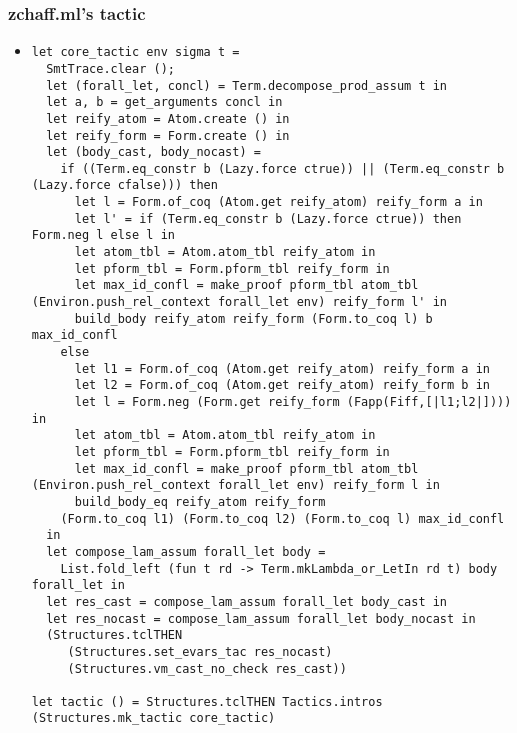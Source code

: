 \documentclass{beamer}
\begin{document}
\begin{frame}[fragile]
\frametitle{zchaff.ml's tactic}
\begin{itemize}
\item
\begin{Verbatim}[fontsize=\tiny]
let core_tactic env sigma t =
  SmtTrace.clear ();
  let (forall_let, concl) = Term.decompose_prod_assum t in
  let a, b = get_arguments concl in
  let reify_atom = Atom.create () in
  let reify_form = Form.create () in
  let (body_cast, body_nocast) =
    if ((Term.eq_constr b (Lazy.force ctrue)) || (Term.eq_constr b (Lazy.force cfalse))) then
      let l = Form.of_coq (Atom.get reify_atom) reify_form a in
      let l' = if (Term.eq_constr b (Lazy.force ctrue)) then Form.neg l else l in
      let atom_tbl = Atom.atom_tbl reify_atom in
      let pform_tbl = Form.pform_tbl reify_form in
      let max_id_confl = make_proof pform_tbl atom_tbl (Environ.push_rel_context forall_let env) reify_form l' in
      build_body reify_atom reify_form (Form.to_coq l) b max_id_confl
    else
      let l1 = Form.of_coq (Atom.get reify_atom) reify_form a in
      let l2 = Form.of_coq (Atom.get reify_atom) reify_form b in
      let l = Form.neg (Form.get reify_form (Fapp(Fiff,[|l1;l2|]))) in
      let atom_tbl = Atom.atom_tbl reify_atom in
      let pform_tbl = Form.pform_tbl reify_form in
      let max_id_confl = make_proof pform_tbl atom_tbl (Environ.push_rel_context forall_let env) reify_form l in
      build_body_eq reify_atom reify_form
    (Form.to_coq l1) (Form.to_coq l2) (Form.to_coq l) max_id_confl
  in
  let compose_lam_assum forall_let body =
    List.fold_left (fun t rd -> Term.mkLambda_or_LetIn rd t) body forall_let in
  let res_cast = compose_lam_assum forall_let body_cast in
  let res_nocast = compose_lam_assum forall_let body_nocast in
  (Structures.tclTHEN
     (Structures.set_evars_tac res_nocast)
     (Structures.vm_cast_no_check res_cast))

let tactic () = Structures.tclTHEN Tactics.intros (Structures.mk_tactic core_tactic)
\end{Verbatim}
\end{itemize}
\end{frame}
\end{document}
